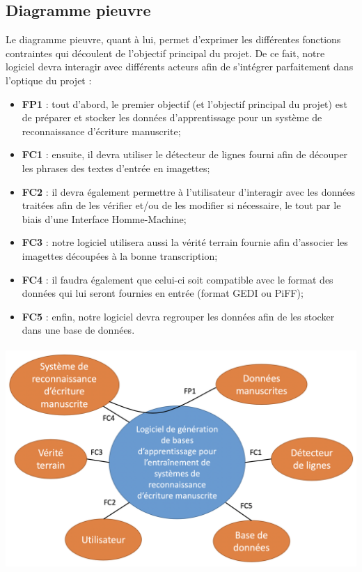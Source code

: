 \subsection{Diagramme pieuvre}

Le diagramme pieuvre, quant à lui, permet d’exprimer les différentes fonctions contraintes
qui découlent de l’objectif principal du projet. De ce fait, notre logiciel devra interagir
avec différents acteurs afin de s’intégrer parfaitement dans l’optique du projet :

\begin{itemize}
\item \textbf{FP1} : tout d’abord, le premier objectif (et l’objectif principal du projet) est
de préparer et stocker les données d’apprentissage pour un système de reconnaissance d’écriture manuscrite;
\item \textbf{FC1} : ensuite, il devra utiliser le détecteur de lignes fourni afin de découper
les phrases des textes d’entrée en imagettes;
\item \textbf{FC2} : il devra également permettre à l’utilisateur d’interagir avec les données
traitées afin de les vérifier et/ou de les modifier si nécessaire, le tout par le biais d’une Interface Homme-Machine;
\item \textbf{FC3} : notre logiciel utilisera aussi la vérité terrain fournie afin d’associer
les imagettes découpées à la bonne transcription;
\item \textbf{FC4} : il faudra également que celui-ci soit compatible avec le format des données
qui lui seront fournies en entrée (format GEDI ou PiFF);
\item \textbf{FC5} : enfin, notre logiciel devra regrouper les données afin de les stocker dans une base de données.
\end{itemize}

\paragraph{}
\begin{mdframed}[frametitle={Figure 7 : Diagramme pieuvre}, innerbottommargin=10]
\begin{center}
\includegraphics[width=0.6\linewidth]{pieuvre.png}
\end{center}
\end{mdframed}